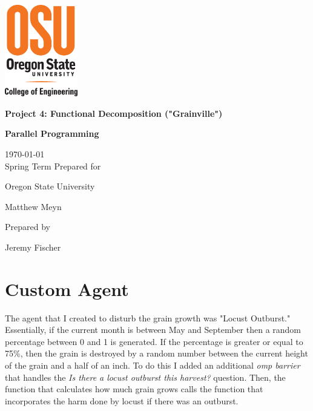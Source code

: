 \documentclass[onecolumn,draftclsnofoot, 10pt, compsoc]{IEEEtran}
\def \Jeremy{			Jeremy Fischer}
\def \Class{		Parallel Programming}
\def \Assn{		Project 4: Functional Decomposition ("Grainville")}
\def \School{	Oregon State University}
\def \Professor{		Matthew Meyn}
\begin{document}
\begin{titlepage}
    \begin{singlespace}
    	\includegraphics[height=4cm]{coe.eps}
        \hfill  
        \par\vspace{.2in}
        \centering
        \scshape{
            \vspace{.5in}
            \textbf{\Large\Assn}\par
            \textbf{\large\Class}\par
            \large{
            	\today \\Spring Term
        	}
            \vfill
            {\large Prepared for}\par
            \huge \School\par
            \vspace{5pt}
            {\Large{\Professor}\par}
            {\large Prepared by }\par

            \vspace{5pt}
            {\Large
                {\Jeremy}\par
            }
            \vspace{20pt}
        }

    \end{singlespace}
\end{titlepage}
\newpage
{}

\clearpage







	\section{Custom Agent}
		The agent that I created to disturb the grain growth was "Locust Outburst."
		Essentially, if the current month is between May and September then a random percentage between 0 and 1 is generated.
		If the percentage is greater or equal to 75\%, then the grain is destroyed by a random number between the current height of the grain and a half of an inch.
		To do this I added an additional \textit{omp barrier} that handles the \textit{Is there a locust outburst this harvest?} question.
		Then, the function that calculates how much grain grows calls the function that incorporates the harm done by locust if there was an outburst.
	
\end{document}
